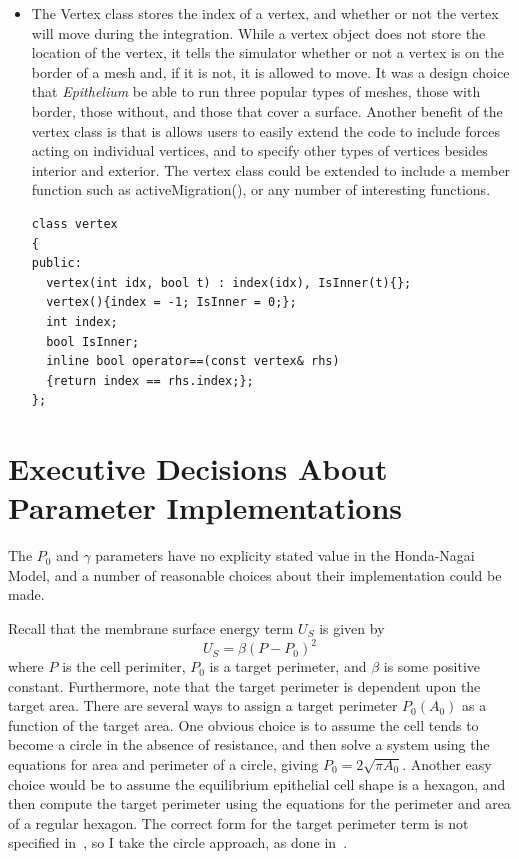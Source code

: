 \begin{itemize}
\begin{lstlisting}
\end{lstlisting}

\item The {\color{green} Vertex} class stores the index of a vertex, and 
whether or not the vertex will move during the integration. While a 
vertex object does not store the location of the vertex, it tells the 
simulator whether or not a vertex is on the border of a mesh and, if it 
is not, it is allowed to move. It was a design choice that 
\emph{Epithelium} be able to run three popular types of meshes, those 
with border, those without, and those that cover a surface.  Another 
benefit of the vertex class is that is allows users to easily extend 
the code to include forces acting on individual vertices, and to 
specify other types of vertices besides interior and exterior. The 
vertex class could be extended to include a member function such as 
activeMigration(), or any number of interesting functions.
\begin{lstlisting}
class vertex
{
public:
  vertex(int idx, bool t) : index(idx), IsInner(t){};
  vertex(){index = -1; IsInner = 0;};
  int index;
  bool IsInner;
  inline bool operator==(const vertex& rhs)
  {return index == rhs.index;};
};
\end{lstlisting}
\end{itemize}

\section{Executive Decisions About Parameter Implementations}
The $P_0$ and $\gamma$ parameters have no explicity stated value in the Honda-Nagai Model, and a number of reasonable choices about their implementation could be made. 

Recall that the membrane surface energy term $U_S$ is given by
\begin{equation}
U_S = \beta(P - P_0)^2
\end{equation}
 where $P$ is the cell perimiter, $P_0$ is a target perimeter, and $\beta$ is some positive constant. Furthermore, note that the target perimeter is dependent upon the target area. There are several ways to assign a target perimeter $P_0(A_0)$ as a function of the target area. One obvious choice is to assume the cell tends to become a circle in the absence of resistance, and then solve a system using the equations for area and perimeter of a circle, giving $P_0 =2\sqrt{\pi A_0}$. Another easy choice would be to assume the equilibrium epithelial cell shape is a hexagon, and then compute the target perimeter using the equations for the perimeter and area of a regular hexagon. The correct form for the target perimeter term is not specified in~\cite{HondaNagai}, so I take the circle approach, as done in~\cite{ChasteMain}.

